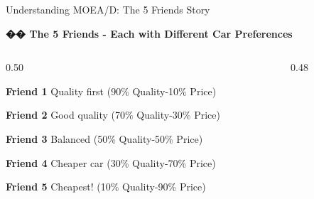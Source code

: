\documentclass[aspectratio=169]{beamer}
\begin{document}
\begin{frame}{Understanding MOEA/D: The 5 Friends Story}
\vspace{-2em}
\begin{center} \textbf{�� The 5 Friends - Each with Different Car Preferences} \end{center}
\pause
\begin{columns}[T]

\begin{column}{0.50\textwidth}

  \vspace{0.4em}

  {\small
  \textcolor{red!70!black}{\textbf{Friend 1}} \quad Quality first  (90\% Quality-10\% Price)

  \vspace{0.4em}
  \textcolor{orange!80!black}{\textbf{Friend 2}} \quad Good quality (70\% Quality-30\% Price)

  \vspace{0.4em}
  \textcolor{yellow!60!black}{\textbf{Friend 3}} \quad Balanced (50\% Quality-50\% Price)

  \vspace{0.4em}
  \textcolor{green!60!black}{\textbf{Friend 4}} \quad Cheaper car (30\% Quality-70\% Price)

  \vspace{0.4em}
  \textcolor{blue!80!black}{\textbf{Friend 5}} \quad Cheapest! (10\% Quality-90\% Price)
  }


  \vspace{1em}
  \pause

\begin{center}
\end{center}

\end{column}

\begin{column}{0.48\textwidth}


\end{column}
\end{columns}
\end{frame}
\end{document}
